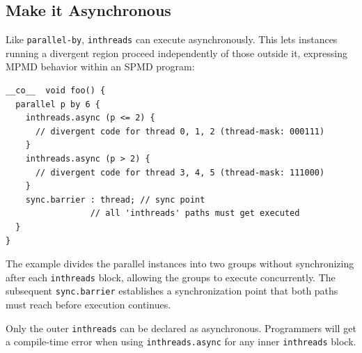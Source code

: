 \subsection*{Make it Asynchronous}

Like \texttt{parallel-by}, \texttt{inthreads} can execute asynchronously. This lets instances running a divergent region proceed independently of those outside it, expressing MPMD behavior within an SPMD program:

\begin{lstlisting}[language=croqtile,caption={Make it Asynchronous}]
__co__  void foo() {
  parallel p by 6 {
    inthreads.async (p <= 2) {
      // divergent code for thread 0, 1, 2 (thread-mask: 000111)
    }
    inthreads.async (p > 2) {
      // divergent code for thread 3, 4, 5 (thread-mask: 111000)
    }
    sync.barrier : thread; // sync point
                 // all 'inthreads' paths must get executed
  }
}
\end{lstlisting}

The example divides the parallel instances into two groups without synchronizing after each \texttt{inthreads} block, allowing the groups to execute concurrently. The subsequent \texttt{sync.barrier} establishes a synchronization point that both paths must reach before execution continues.

Only the outer \texttt{inthreads} can be declared as asynchronous. Programmers will get a compile-time error when using \texttt{inthreads.\allowbreak{}async} for any inner \texttt{inthreads} block.
